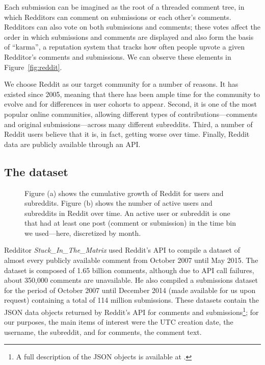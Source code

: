 Each submission can be imagined as the root of a threaded comment tree, in which Redditors can comment on submissions or each other's comments.  Redditors can also vote on both submissions and comments; these votes affect the order in which submissions and comments are displayed and also form the basis of ``karma'', a reputation system that tracks how often people upvote a given Redditor's comments and submissions. We can observe these elements in Figure~\ref{fig:reddit}. 

We choose Reddit as our target community for a number of reasons.  It has existed since 2005, meaning that there has been ample time for the community to evolve and for differences in user cohorts to appear.  Second, it is one of the most popular online communities, allowing different types of contributions---comments and original submissions---across many different subreddits.  Third, a number of Reddit users believe that it is, in fact, getting worse over time\cite{RedditWorse1,RedditWorse2,RedditWorse3,RedditWorse4,RedditWorse5,RedditWorse6}. Finally, Reddit data are publicly available through an API.

\subsection{The dataset}

\begin{figure}[!tb]
\centering
{}
\caption{Figure (a) shows the cumulative growth of Reddit for users and subreddits. Figure (b) shows the number of active users and subreddits in Reddit over time. An active user or subreddit is one that had at least one post (comment or submission) in the time bin we used---here, discretized by month.}
\label{fig:cumulative}
\end{figure}

Redditor \textit{Stuck\_In\_The\_Matrix} used Reddit's API to compile a dataset of almost every publicly available comment\cite{RedditDataset1} from October 2007 until May 2015.  The dataset is composed of 1.65 billion comments, although due to API call failures, about 350,000 comments are unavailable.  He also compiled a submissions dataset for the period of October 2007 until December 2014 (made available for us upon request) containing a total of 114 million submissions.  These datasets contain the JSON data objects returned by Reddit's API for comments and submissions\footnote{A full description of the JSON objects is available at \cite{RedditAPI}.}; for our purposes, the main items of interest were the UTC creation date, the username, the subreddit, and for comments, the comment text.

